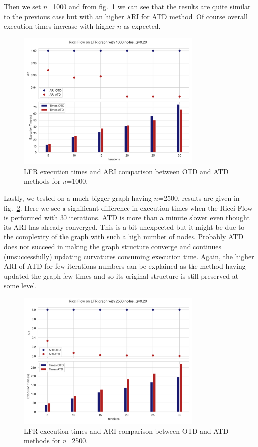 Then we set $n$=1000 and from fig.~\ref{fig:times_1000} we can see that the results are quite similar to the previous case but with an higher ARI for ATD method. Of course overall execution times increase with higher $n$ as expected.
\begin{figure}
    \centering
    \includegraphics[width=0.8\textwidth]{../tests/LFRResults/Exe_times_LFR_1000_nodes.png}
    \caption{LFR execution times and ARI comparison between OTD and ATD methods for $n$=1000.}
    \label{fig:times_1000}
\end{figure}

Lastly, we tested on a much bigger graph having $n$=2500, results are given in fig.~\ref{fig:times_2500}. Here we see a significant difference in execution times when the Ricci Flow is performed with 30 iterations.
ATD is more than a minute slower even thought its ARI has already converged. This is a bit unexpected but it might be due to the complexity of the graph with such a high number of nodes. Probably ATD does not succeed in 
making the graph structure converge and continues (unsuccessfully) updating curvatures consuming execution time. Again, the higher ARI of ATD for few iterations numbers can be explained as the method having updated the graph few times and so its original structure is still preserved at some level.
\begin{figure}
    \centering
    \includegraphics[width=0.8\textwidth]{../tests/LFRResults/Exe_times_LFR_2500_nodes.png}
    \caption{LFR execution times and ARI comparison between OTD and ATD methods for $n$=2500.}
    \label{fig:times_2500}
\end{figure}

